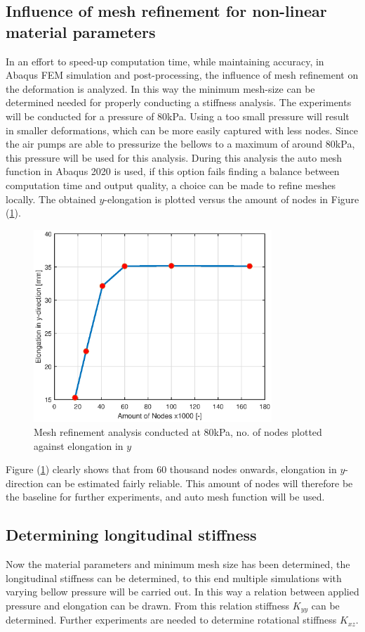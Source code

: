 \subsection{Influence of mesh refinement for non-linear material parameters}

In an effort to speed-up computation time, while maintaining accuracy, in Abaqus FEM simulation and post-processing, the influence of mesh refinement on the deformation is analyzed. In this way the minimum mesh-size can be determined needed for properly conducting a stiffness analysis. The experiments will be conducted for a pressure of 80kPa. Using a too small pressure will result in smaller deformations, which can be more easily captured with less nodes. Since the air pumps are able to pressurize the bellows to a maximum of around 80kPa, this pressure will be used for this analysis. During this analysis the auto mesh function in Abaqus 2020 is used, if this option fails finding a balance between computation time and output quality, a choice can be made to refine meshes locally. The obtained $y$-elongation is plotted versus the amount of nodes in Figure (\ref{fig2:meshrefinement}).


\begin{figure}[H]
    \centering
    \includegraphics[width = 0.8\textwidth]{Figures/Chapter2/MeshRefinement.eps}
    \caption{Mesh refinement analysis conducted at 80kPa, no. of nodes plotted against elongation in $y$}
    \label{fig2:meshrefinement}
\end{figure}

Figure (\ref{fig2:meshrefinement}) clearly shows that from 60 thousand nodes onwards, elongation in $y$-direction can be estimated fairly reliable. This amount of nodes will therefore be the baseline for further experiments, and auto mesh function will be used.



\subsection{Determining longitudinal stiffness}
Now the material parameters and minimum mesh size has been determined, the longitudinal stiffness can be determined, to this end multiple simulations with varying bellow pressure will be carried out. In this way a relation between applied pressure and elongation can be drawn. From this relation stiffness $K_{yy}$ can be determined. Further experiments are needed to determine rotational stiffness $K_{xz}$.